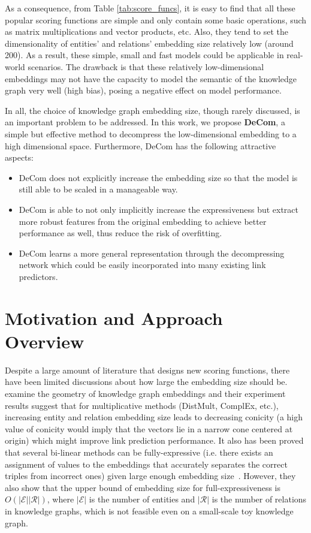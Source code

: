 \documentclass[letterpaper]{article} \usepackage{aaai20}  \usepackage{times}  \usepackage{helvet} \usepackage{courier}  \usepackage{booktabs}
\begin{document}
As a consequence, from Table \ref{tab:score_funcs}, it is easy to find that all these popular scoring functions are simple and only contain some basic operations, such as matrix multiplications and vector products, etc. Also, they tend to set the dimensionality of entities' and relations' embedding size relatively low (around 200). As a result, these simple, small and fast models could be applicable in real-world scenarios. 
The drawback is that these relatively low-dimensional embeddings may not have the capacity to model the semantic of the knowledge graph very well (high bias), posing a negative effect on model performance.

In all, the choice of knowledge graph embedding size, though rarely discussed, is an important problem to be addressed.
In this work, we propose \textbf{DeCom}, a simple but effective method to decompress the low-dimensional embedding to a high dimensional space. Furthermore, DeCom has the following attractive aspects:
\begin{itemize}
    \item DeCom does not explicitly increase the embedding size so that the model is still able to be scaled in a manageable way.
    \item DeCom is able to not only implicitly increase the expressiveness but extract more robust features from the original embedding to achieve better performance as well, thus reduce the risk of overfitting.
    \item DeCom learns a more general representation through the decompressing network which could be easily incorporated into many existing link predictors.
\end{itemize}


\section{Motivation and Approach Overview}
 

Despite a large amount of literature that designs new scoring functions, there have been limited discussions about how large the embedding size should be. \citeauthor{sharma2018towards}~ examine the geometry of knowledge graph embeddings and their experiment results suggest that for multiplicative methods (DistMult, ComplEx, etc.), increasing entity and relation embedding size leads to decreasing conicity (a high value of conicity would imply that the vectors lie in a narrow cone centered at origin) which might improve link prediction performance. 
It also has been proved that several bi-linear methods can be fully-expressive (i.e. there exists an assignment of values to the embeddings that accurately separates the correct triples from incorrect ones) given large enough embedding size~\cite{kazemi2018simple}. However, they also show that the upper bound of embedding size for full-expressiveness is $O(|\mathcal{E}||\mathcal{R}|)$, where $|\mathcal{E}|$ is the number of entities and $|\mathcal{R}|$ is the number of relations in knowledge graphs, which is not feasible even on a small-scale toy knowledge graph.
\end{document}
